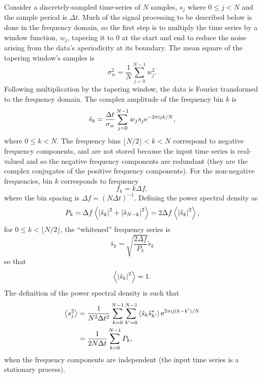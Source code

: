 \documentclass[10pt]{article}
\begin{document}
Consider a discretely-sampled time-series of \(N\) samples, \(s_j\) where
\(0 \leq j < N\) and the sample period is \(\Delta t\).  Much of the signal
processing to be described below is done in the frequency domain, so the
first step is to multiply the time series by a window function, \(w_{j}\),
tapering it to 0 at the start and end to reduce the noise arising from the
data's aperiodicity at its boundary.  The mean square of the tapering
window's samples is
\begin{equation}
\sigma_{w}^{2}
   = \frac{1}{N} \sum_{j = 0}^{N - 1} w_{j}^2.
\end{equation}
Following multiplication by the tapering window, the data is Fourier
transformed to the frequency domain.  The complex amplitude of the
frequency bin \(k\) is
\begin{equation}
\tilde{s}_{k}
   = \frac{\Delta t}{\sigma_{w}} \sum_{j = 0}^{N - 1} w_{j} s_{j} \mathrm{e}^{-2
   \pi \mathrm{i} j k / N},
\end{equation}
where \(0 \leq k < N\).  The frequency bins \(\lfloor N / 2 \rfloor < k <
N\) correspond to negative frequency components, and are not stored because
the input time series is real-valued and so the negative frequency
components are redundant (they are the complex conjugates of the positive
frequency components).  For the non-negative frequencies, bin \(k\)
corresponds to frequency
\begin{equation}
f_{k}
   = k \Delta f,
\end{equation}
where the bin spacing is \(\Delta f = (N \Delta t)^{-1}\).  Defining the
power spectral density as
\begin{equation}
P_{k}
   = \Delta f \left\langle\left|\tilde{s}_{k}\right|^{2} + \left|\tilde{s}_{N
   - k}\right|^{2}\right\rangle
   = 2 \Delta f \left\langle\left|\tilde{s}_{k}\right|^{2}\right\rangle,
\end{equation}
for \(0 \leq k < \lfloor N / 2 \rfloor\), the ``whitened'' frequency series
is
\begin{equation}
\hat{s}_{k}
   = \sqrt{\frac{2 \Delta f}{P_{k}}} \tilde{s}_{k}
\end{equation}
so that
\begin{equation}
\label{eqn3}
\left\langle\left|\hat{s}_{k}\right|^2\right\rangle
   = 1.
\end{equation}
The definition of the power spectral density is such that
\begin{align}
\left\langle s_{j}^{2}\right\rangle
   & = \frac{1}{N^{2} \Delta t^{2}} \sum_{k = 0}^{N - 1} \sum_{k' = 0}^{N -
   1} \left\langle\tilde{s}_{k} \tilde{s}^{*}_{k'}\right\rangle \mathrm{e}^{2 \pi \mathrm{i} j (k - k')
   / N}
   \\
   & = \frac{1}{2 N \Delta t} \sum_{k = 0}^{N - 1} P_{k},
\end{align}
when the frequency components are independent (the input time series is a
stationary process).
\end{document}
